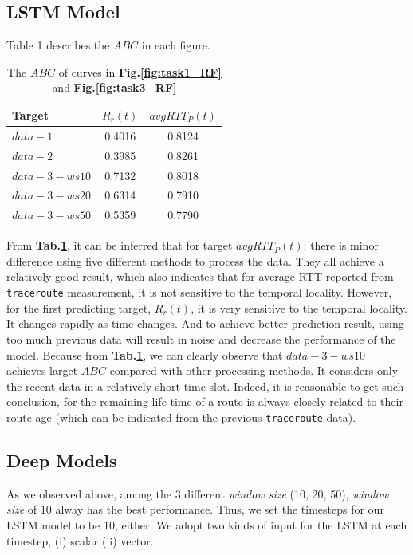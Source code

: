 \documentclass[sigconf]{acmart}
\begin{document}
\subsection{LSTM Model}


Table 1 describes the $ABC$ in each figure.
\begin{table}[tbp]
	\centering  
	\begin{tabular}{lcc} 
		\hline
		Target &$R_r(t)$ &$avgRTT_P(t)$ \\ \hline
		$data-1$ & 0.4016    &0.8124   \\        
		$data-2$ &0.3985 &0.8261 \\        
		$data-3-ws10$  &0.7132 &0.8018 \\
		$data-3-ws20$ &0.6314 &0.7910 \\
		$data-3-ws50$ &0.5359  &0.7790 \\ \hline
	\end{tabular}
	\caption{The $ABC$ of curves
		 in \textbf{Fig.\ref{fig:task1_RF}} and \textbf{Fig.\ref{fig:task3_RF}} }
	 \label{tab:result_RF}
\end{table}
From \textbf{Tab.\ref{tab:result_RF}}, it can be inferred that for target $avgRTT_P(t)$: there is minor difference using five different methods to process the data. They all achieve a relatively good result, which also indicates that for average RTT reported from \texttt{traceroute} measurement, it is not sensitive to the temporal locality. However, for the first predicting target, $R_r(t)$, it is very sensitive to the temporal locality. It changes rapidly as time changes. And to achieve better prediction result, using too much previous data will result in noise and decrease the performance of the model. Because from \textbf{Tab.\ref{tab:result_RF}}, we can clearly observe that $data-3-ws10$ achieves larget $ABC$ compared with other processing methods. It considers only the recent data in a relatively short time slot. Indeed, it is reasonable to get such conclusion, for the remaining life time of a route is always closely related to their route age (which can be indicated from the previous \texttt{traceroute} data).
\subsection{Deep Models}

 As we observed above, among the 3 different \textit{window size} (10, 20, 50), \textit{window size} of 10 alway has the best performance. Thus, we set the timesteps for our LSTM model to be 10, either.  We adopt two kinds of input for the LSTM at each timestep, (i) scalar (ii) vector.
\end{document}
